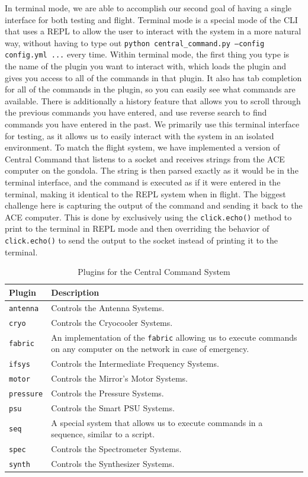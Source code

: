 In terminal mode, we are able to accomplish our second goal of having a single interface for both testing and flight.
Terminal mode is a special mode of the CLI that uses a REPL to allow the user to interact with the system in a more natural way, without having to type out \texttt{python central\_command.py --config config.yml ...} every time.
Within terminal mode, the first thing you type is the name of the plugin you want to interact with, which loads the plugin and gives you access to all of the commands in that plugin.
It also has tab completion for all of the commands in the plugin, so you can easily see what commands are available.
There is additionally a history feature that allows you to scroll through the previous commands you have entered, and use reverse search to find commands you have entered in the past.
We primarily use this terminal interface for testing, as it allows us to easily interact with the system in an isolated environment.
To match the flight system, we have implemented a version of Central Command that listens to a socket and receives strings from the ACE computer on the gondola. 
The string is then parsed exactly as it would be in the terminal interface, and the command is executed as if it were entered in the terminal, making it identical to the REPL system when in flight. 
The biggest challenge here is capturing the output of the command and sending it back to the ACE computer.
This is done by exclusively using the \texttt{click.echo()} method to print to the terminal in REPL mode and then overriding the behavior of \texttt{click.echo()} to send the output to the socket instead of printing it to the terminal.

\begin{table}
    \centering
    \begin{tabularx}{\textwidth}{l|X}
        \textbf{Plugin} & \textbf{Description} \\
        \hline
        \texttt{antenna} & Controls the Antenna Systems. \\
        \texttt{cryo} & Controls the Cryocooler Systems. \\
        \texttt{fabric} & An implementation of the \texttt{fabric} allowing us to execute commands on any computer on the network in case of emergency. \\
        \texttt{ifsys} & Controls the Intermediate Frequency Systems. \\
        \texttt{motor} & Controls the Mirror's Motor Systems. \\
        \texttt{pressure} & Controls the Pressure Systems. \\
        \texttt{psu} & Controls the Smart PSU Systems. \\
        \texttt{seq} & A special system that allows us to execute commands in a sequence, similar to a script. \\
        \texttt{spec} & Controls the Spectrometer Systems. \\
        \texttt{synth} & Controls the Synthesizer Systems. \\
    \end{tabularx}
    \label{readout/table:click_plugins}
    \caption{Plugins for the Central Command System}
\end{table}

